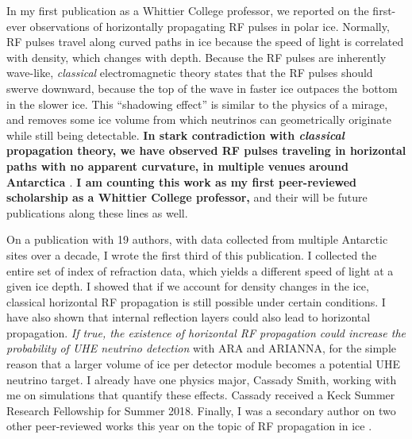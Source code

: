 \documentclass[../../main.tex]{subfiles}
\begin{document}
In my first publication as a Whittier College professor, we reported on the first-ever observations of horizontally propagating RF pulses in polar ice.  Normally, RF pulses travel along curved paths in ice because the speed of light is correlated with density, which changes with depth.  Because the RF pulses are inherently wave-like, \textit{classical} electromagnetic theory states that the RF pulses should swerve downward, because the top of the wave in faster ice outpaces the bottom in the slower ice.  This ``shadowing effect'' is similar to the physics of a mirage, and removes some ice volume from which neutrinos can geometrically originate while still being detectable.  \textbf{In stark contradiction with \textit{classical} propagation theory, we have observed RF pulses traveling in horizontal paths with no apparent curvature, in multiple venues around Antarctica \cite{horizPaper}}.  \textbf{I am counting this work as my first peer-reviewed scholarship as a Whittier College professor,} and their will be future publications along these lines as well. \\ \hspace{0.1cm}

On a publication with 19 authors, with data collected from multiple Antarctic sites over a decade, I wrote the first third of this publication.  I collected the entire set of index of refraction data, which yields a different speed of light at a given ice depth.  I showed that if we account for density changes in the ice, classical horizontal RF propagation is still possible under certain conditions.  I have also shown that internal reflection layers could also lead to horizontal propagation.  \textit{If true, the existence of horizontal RF propagation could increase the probability of UHE neutrino detection} with ARA and ARIANNA, for the simple reason that a larger volume of ice per detector module becomes a potential UHE neutrino target.  I already have one physics major, Cassady Smith, working with me on simulations that quantify these effects.  Cassady received a Keck Summer Research Fellowship for Summer 2018.  Finally, I was a secondary author on two other peer-reviewed works this year on the topic of RF propagation in ice \cite{flare} \cite{dielectric}.
\end{document}
